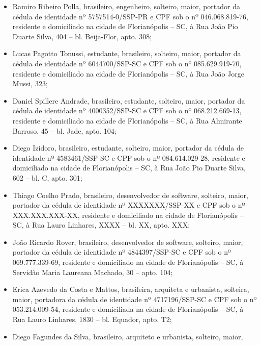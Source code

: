 \documentclass[a4paper]{report}
\begin{document}
\begin{enumerate}
      \begin{itemize}
      \item Ramiro Ribeiro Polla, brasileiro, engenheiro, solteiro, maior,
            portador da cédula de identidade nº 5757514-0/SSP-PR
            e CPF sob o nº 046.068.819-76,
            residente e domiciliado na cidade de
            Florianópolis – SC, à Rua João Pio Duarte Silva, 404 – bl. Beija-Flor, apto. 308;
      \item Lucas Pagotto Tonussi, estudante, brasileiro, solteiro, maior,
            portador da cédula de identidade nº 6044700/SSP-SC
            e CPF sob o nº 085.629.919-70,
            residente e domiciliado na cidade de
            Florianópolis – SC, à Rua João Jorge Mussi, 323;
      \item Daniel Spillere Andrade, brasileiro, estudante, solteiro, maior,
            portador da cédula de identidade nº 4000352/SSP-SC
            e CPF sob o nº 068.212.669-13,
            residente e domiciliado na cidade de
            Florianópolis – SC, à Rua Almirante Barroso, 45 – bl. Jade, apto. 104;
      \item Diego Izidoro, brasileiro, estudante, solteiro, maior,
            portador da cédula de identidade nº 4583461/SSP-SC
            e CPF sob o nº 084.614.029-28,
            residente e domiciliado na cidade de
            Florianópolis – SC, à Rua João Pio Duarte Silva, 602 – bl. C, apto. 301;
      \item Thiago Coelho Prado, brasileiro, desenvolvedor de software, solteiro, maior,
            portador da cédula de identidade nº XXXXXXX/SSP-XX
            e CPF sob o nº XXX.XXX.XXX-XX,
            residente e domiciliado na cidade de
            Florianópolis – SC, à Rua Lauro Linhares, XXXX – bl. XX, apto. XXX;
      \item João Ricardo Rover, brasileiro, desenvolvedor de software, solteiro, maior,
            portador da cédula de identidade nº 4844397/SSP-SC
            e CPF sob o nº 069.777.339-69,
            residente e domiciliado na cidade de
            Florianópolis – SC, à Servidão Maria Laureana Machado, 30 – apto. 104;
      \item Erica Azevedo da Costa e Mattos, brasileira, arquiteta e urbanista, solteira, maior,
            portadora da cédula de identidade nº 4717196/SSP-SC
            e CPF sob o nº 053.214.009-54,
            residente e domiciliada na cidade de
            Florianópolis – SC, à Rua Lauro Linhares, 1830 – bl. Equador, apto. T2;
      \item Diego Fagundes da Silva, brasileiro, arquiteto e urbanista, solteiro, maior,

\end{itemize}
\end{enumerate}
\end{document}
